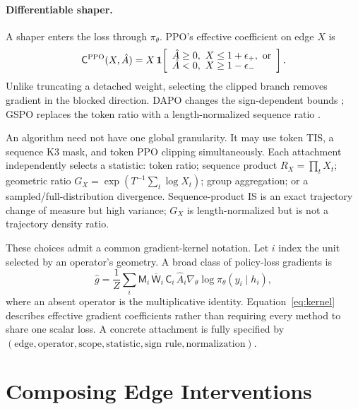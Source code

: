 \documentclass[10pt,twocolumn]{article}
\newcommand{\cur}{\pi_\theta}
\newcommand{\Mask}{\mathsf{M}}
\newcommand{\Weight}{\mathsf{W}}
\newcommand{\Shape}{\mathsf{C}}
\begin{document}
\paragraph{Differentiable shaper.}
A shaper enters the loss through \(\cur\).  PPO's effective coefficient on edge \(X\) is
\begin{equation}
\Shape^{\rm PPO}(X,\hat A)=X\,\mathbf 1\!\left[
\begin{array}{l}
\hat A\ge0,\ X\le1+\epsilon_+,\ \text{or}\\[-1mm]
\hat A<0,\ X\ge1-\epsilon_-
\end{array}\right].
\label{eq:ppo-kernel}
\end{equation}
Unlike truncating a detached weight, selecting the clipped branch removes gradient in the blocked direction.  DAPO changes the sign-dependent bounds \citep{yu2025dapo}; GSPO replaces the token ratio with a length-normalized sequence ratio \citep{zheng2025gspo}.

An algorithm need not have one global granularity.  It may use token TIS, a sequence K3 mask, and token PPO clipping simultaneously.  Each attachment independently selects a statistic: token ratio; sequence product \(R_X=\prod_tX_t\); geometric ratio \(G_X=\exp(T^{-1}\sum_t\log X_t)\); group aggregation; or a sampled/full-distribution divergence.  Sequence-product IS is an exact trajectory change of measure but high variance; \(G_X\) is length-normalized but is not a trajectory density ratio.

These choices admit a common gradient-kernel notation.  Let \(i\) index the unit selected by an operator's geometry.  A broad class of policy-loss gradients is
\begin{equation}
    \widehat g=\frac{1}{Z}\sum_i
    \Mask_i\,\overline{\Weight}_i\,\Shape_i\,
    \hat A_i\nabla_\theta\log\cur(y_i\mid h_i),
    \label{eq:kernel}
\end{equation}
where an absent operator is the multiplicative identity.  Equation~\eqref{eq:kernel} describes effective gradient coefficients rather than requiring every method to share one scalar loss.  A concrete attachment is fully specified by
\((\text{edge},\text{operator},\text{scope},\text{statistic},\text{sign rule},\text{normalization})\).

\section{Composing Edge Interventions}
\label{sec:composition}
\end{document}
